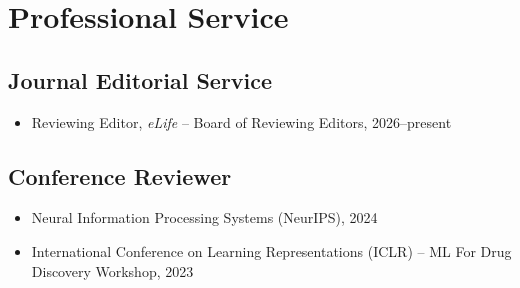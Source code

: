 \documentclass{tccv_Eyal}
\begin{document}
\section{Professional Service}
\subsection{Journal Editorial Service}
\begin{itemize}
    \item
    Reviewing Editor, \textit{eLife} -- Board of Reviewing Editors, 2026--present
\end{itemize}
\subsection{Conference Reviewer}
\begin{itemize}
    \item
    Neural Information Processing Systems (NeurIPS), 2024
    \item
    International Conference on Learning Representations (ICLR) -- ML For Drug Discovery Workshop, 2023
\end{itemize}




\end{document}

